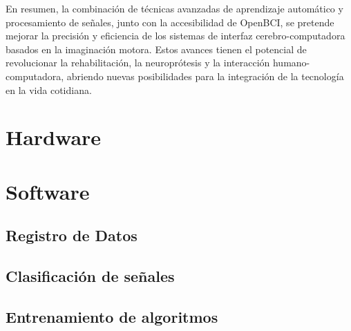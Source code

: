 En resumen, la combinación de técnicas avanzadas de aprendizaje automático y procesamiento de señales, junto con la accesibilidad de OpenBCI, se pretende mejorar la precisión y eficiencia de los sistemas de interfaz cerebro-computadora basados en la imaginación motora. Estos avances tienen el potencial de revolucionar la rehabilitación, la neuroprótesis y la interacción humano-computadora, abriendo nuevas posibilidades para la integración de la tecnología en la vida cotidiana.





\section{Hardware}

\section{Software}

\subsection{Registro de Datos}

\subsection{Clasificación de señales}

\subsection{Entrenamiento de algoritmos}